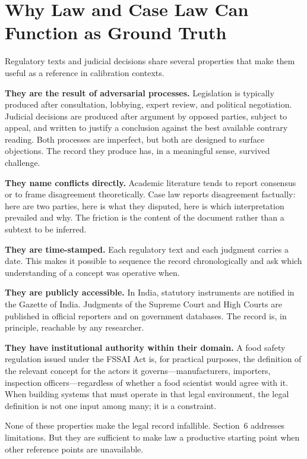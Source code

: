 \documentclass[12pt,a4paper]{article}
\begin{document}
\section{Why Law and Case Law Can Function as Ground Truth}

Regulatory texts and judicial decisions share several properties that make them
useful as a reference in calibration contexts.

\textbf{They are the result of adversarial processes.} Legislation is typically
produced after consultation, lobbying, expert review, and political negotiation.
Judicial decisions are produced after argument by opposed parties, subject to
appeal, and written to justify a conclusion against the best available contrary
reading. Both processes are imperfect, but both are designed to surface objections.
The record they produce has, in a meaningful sense, survived challenge.

\textbf{They name conflicts directly.} Academic literature tends to report
consensus or to frame disagreement theoretically. Case law reports disagreement
factually: here are two parties, here is what they disputed, here is which
interpretation prevailed and why. The friction is the content of the document
rather than a subtext to be inferred.

\textbf{They are time-stamped.} Each regulatory text and each judgment carries a
date. This makes it possible to sequence the record chronologically and ask which
understanding of a concept was operative when.

\textbf{They are publicly accessible.} In India, statutory instruments are notified
in the Gazette of India. Judgments of the Supreme Court and High Courts are
published in official reporters and on government databases. The record is, in
principle, reachable by any researcher.

\textbf{They have institutional authority within their domain.} A food safety
regulation issued under the FSSAI Act is, for practical purposes, the definition
of the relevant concept for the actors it governs---manufacturers, importers,
inspection officers---regardless of whether a food scientist would agree with it.
When building systems that must operate in that legal environment, the legal
definition is not one input among many; it is a constraint.

None of these properties make the legal record infallible. Section~6 addresses
limitations. But they are sufficient to make law a productive starting point when
other reference points are unavailable.
\end{document}
